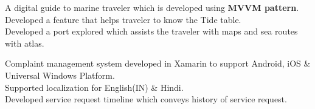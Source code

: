 \documentclass[a4paper]{arun-resume} %
\begin{document}
\begin{minipage}[t]{0.65\textwidth}

A digital guide to marine traveler which is developed using \textbf{MVVM pattern}.\\
Developed a feature that helps traveler to know the Tide table.\\
Developed a port explored which assists the traveler with maps and sea routes with atlas.\\

\sectionspace %










Complaint management system developed in Xamarin to support Android, iOS \& Universal Windows Platform.\\
Supported localization for English(IN) \& Hindi.\\
Developed service request timeline which conveys history of service request.\\

\sectionspace %


\end{minipage} %
\end{document}
